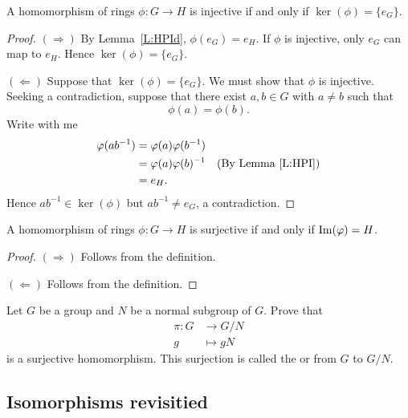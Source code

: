 \documentclass{ximera}
\begin{document}
\begin{lemma}
  A homomorphism of rings $\phi:G\to H$ is injective if and only if
  $\ker(\phi) = \{e_G\}$.
  \begin{proof}
    $(\Rightarrow)$ By Lemma~\ref{L:HPId}, $\phi(e_G) = e_H$. If
    $\phi$ is injective, only $e_G$ can map to $e_H$. Hence
    $\ker(\phi) = \{e_G\}$.


    $(\Leftarrow)$ Suppose that $\ker(\phi) = \{e_G\}$. We must show
    that $\phi$ is injective. Seeking a contradiction, suppose that
    there exist $a,b\in G$ with $a\ne b$ such that
    \[
    \phi(a) = \phi(b).
    \]
    Write with me
    \begin{align*}
      \phi(ab^{-1}) &=\phi(a)\phi(b^{-1})\\
      &= \phi(a) \phi(b)^{-1} & \text{(By Lemma~\ref{L:HPI})}\\
      &= e_H.
    \end{align*}
    Hence $ab^{-1}\in\ker(\phi)$ but $ab^{-1}\ne e_G$, a
    contradiction.
  \end{proof}
\end{lemma}


\begin{lemma}
    A homomorphism of rings $\phi:G\to H$ is surjective if and only if
    $\im(\phi) = H$.
    \begin{proof}
      $(\Rightarrow)$ Follows from the definition.

      $(\Leftarrow)$ Follows from the definition.
    \end{proof}
\end{lemma}







\begin{exercise}
  Let $G$ be a group and $N$ be a normal subgroup of $G$. Prove that
  \begin{align*}
  \pi:G &\to G/N\\
  g &\mapsto gN
  \end{align*}
  is a surjective homomorphism. This surjection is called the
   or  from $G$ to
  $G/N$.
\end{exercise}





\subsection{Isomorphisms revisitied}
\end{document}
